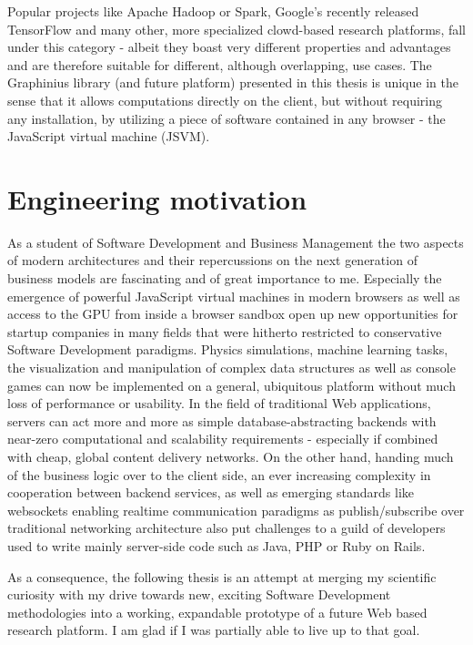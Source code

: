 Popular projects like Apache Hadoop or Spark, Google's recently released TensorFlow and many other, more specialized clowd-based research platforms, fall under this category - albeit they boast very different properties and advantages and are therefore suitable for different, although overlapping, use cases. The Graphinius library (and future platform) presented in this thesis is unique in the sense that it allows computations directly on the client, but without requiring any installation, by utilizing a piece of software contained in any browser - the JavaScript virtual machine (JSVM). 


\section{Engineering motivation}
\label{sect:engineering_motivation}

As a student of Software Development and Business Management the two aspects of modern architectures and their repercussions on the next generation of business models are fascinating and of great importance to me. Especially the emergence of powerful JavaScript virtual machines in modern browsers as well as access to the GPU from inside a browser sandbox open up new opportunities for startup companies in many fields that were hitherto restricted to conservative Software Development paradigms. Physics simulations, machine learning tasks, the visualization and manipulation of complex data structures as well as console games can now be implemented on a general, ubiquitous platform without much loss of performance or usability. In the field of traditional Web applications, servers can act more and more as simple database-abstracting backends with near-zero computational and scalability requirements - especially if combined with cheap, global content delivery networks. On the other hand, handing much of the business logic over to the client side, an ever increasing complexity in cooperation between backend services, as well as emerging standards like websockets enabling realtime communication paradigms as publish/subscribe over traditional networking architecture also put challenges to a guild of developers used to write mainly server-side code such as Java, PHP or Ruby on Rails.

As a consequence, the following thesis is an attempt at merging my scientific curiosity with my drive towards new, exciting Software Development methodologies into a working, expandable prototype of a future Web based research platform. I am glad if I was partially able to live up to that goal.



